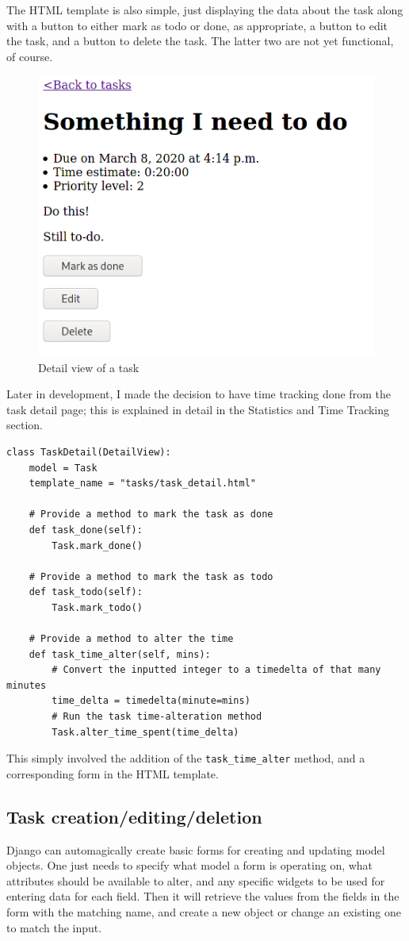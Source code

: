 \documentclass{article}
\begin{document}
The HTML template is also simple,
just displaying the data about the task along with a button to either mark as todo or done,
as appropriate,
a button to edit the task,
and a button to delete the task.
The latter two are not yet functional,
of course.

\begin{figure}[H]
	\centering
	\includegraphics[width=0.6\linewidth]{Screenshots/task_detail.png}
	\caption{Detail view of a task}
	\label{fig:task_detail1}
\end{figure}

Later in development,
I made the decision to have time tracking done from the task detail page;
this is explained in detail in the Statistics and Time Tracking section.

\begin{lstlisting}
class TaskDetail(DetailView):
    model = Task
    template_name = "tasks/task_detail.html"

    # Provide a method to mark the task as done
    def task_done(self):
        Task.mark_done()

    # Provide a method to mark the task as todo
    def task_todo(self):
        Task.mark_todo()

    # Provide a method to alter the time
    def task_time_alter(self, mins):
        # Convert the inputted integer to a timedelta of that many minutes
        time_delta = timedelta(minute=mins)
        # Run the task time-alteration method
        Task.alter_time_spent(time_delta)
\end{lstlisting}

This simply involved the addition of the \texttt{task\_time\_alter} method,
and a corresponding form in the HTML template.

\subsection{Task creation/editing/deletion}
Django can automagically create basic forms for creating and updating model objects.
One just needs to specify what model a form is operating on,
what attributes should be available to alter,
and any specific widgets to be used for entering data for each field.
Then it will retrieve the values from the fields in the form with the matching name,
and create a new object or change an existing one to match the input.
\end{document}
